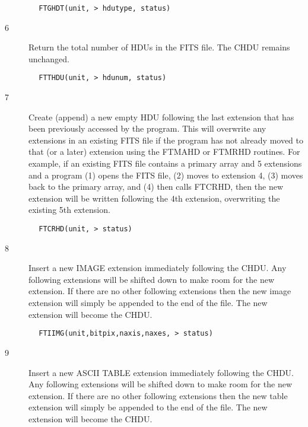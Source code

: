 \documentclass[11pt]{book}
\begin{document}
\begin{verbatim}
        FTGHDT(unit, > hdutype, status)
\end{verbatim}

\begin{description}
\item[6 ] Return the total number of HDUs in the FITS file.
   The CHDU remains unchanged.
\end{description}

\begin{verbatim}
        FTTHDU(unit, > hdunum, status)
\end{verbatim}

\begin{description}
\item[7 ]Create (append) a new empty HDU following the last extension that
    has been previously accessed by the program.   This will overwrite
    any extensions in an existing FITS file if the program has not already
    moved to that (or a later) extension using the FTMAHD or FTMRHD routines.
    For example, if an existing FITS file contains a primary array and 5
    extensions and a program (1) opens the FITS file, (2) moves to
    extension 4, (3) moves back to the primary array, and (4) then calls
    FTCRHD, then the new extension will be written following the 4th
   extension, overwriting the existing 5th extension.
\end{description}

\begin{verbatim}
        FTCRHD(unit, > status)
\end{verbatim}

\begin{description}
\item[8 ] Insert a new IMAGE extension immediately following the CHDU.
    Any following extensions will be shifted down to make room for
    the new extension.  If there are no other following extensions
    then the new image extension will simply be appended to the
   end of the file.  The new extension will become the CHDU.
\end{description}

\begin{verbatim}
        FTIIMG(unit,bitpix,naxis,naxes, > status)
\end{verbatim}

\begin{description}
\item[9 ] Insert a new ASCII TABLE extension immediately following the CHDU.
    Any following extensions will be shifted down to make room for
    the new extension.  If there are no other following extensions
    then the new table extension will simply be appended to the
   end of the file.  The new extension will become the CHDU.
\end{description}
\end{document}
